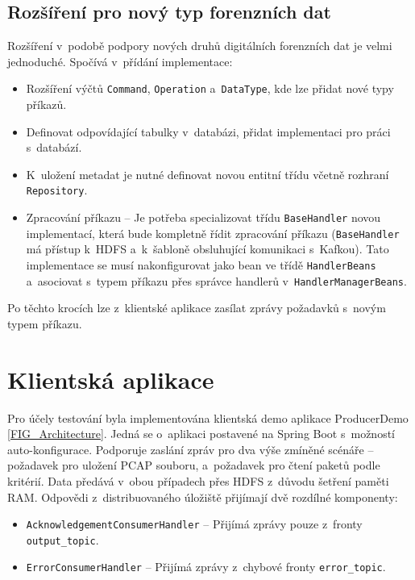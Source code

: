 \subsection{Rozšíření pro nový typ forenzních dat}
Rozšíření v~podobě podpory nových druhů digitálních forenzních dat je velmi jednoduché. Spočívá v~přídání implementace:

\begin{itemize}
    \item Rozšíření výčtů \texttt{Command}, \texttt{Operation} a~\texttt{DataType}, kde lze přidat nové typy příkazů.
    
    \item Definovat odpovídající tabulky v~databázi, přidat implementaci pro práci s~databází.
    
    \item K~uložení metadat je nutné definovat novou entitní třídu včetně rozhraní \texttt{Repository}.
    
    \item Zpracování příkazu -- Je potřeba specializovat třídu \texttt{BaseHandler} novou implementací, která bude kompletně řídit zpracování příkazu (\texttt{BaseHandler} má přístup k~HDFS a~k~šabloně obsluhující komunikaci s~Kafkou). Tato implementace se musí nakonfigurovat jako bean ve třídě \texttt{HandlerBeans} a~asociovat s~typem příkazu přes správce handlerů v~\texttt{HandlerManagerBeans}.
\end{itemize}

\noindent Po těchto krocích lze z~klientské aplikace zasílat zprávy požadavků s~novým typem příkazu.

\section{Klientská aplikace}
Pro účely testování byla implementována klientská demo aplikace ProducerDemo \ref{FIG_Architecture}. Jedná se o~aplikaci postavené na Spring Boot s~možností auto-konfigurace. Podporuje zaslání zpráv pro dva výše zmíněné scénáře -- požadavek pro uložení PCAP souboru, a~požadavek pro čtení paketů podle kritérií. Data předává v~obou případech přes HDFS z~důvodu šetření paměti RAM. Odpovědi z~distribuovaného úložiště přijímají dvě rozdílné komponenty:

\begin{itemize}
    \item \texttt{AcknowledgementConsumerHandler} -- Přijímá zprávy pouze z~fronty \texttt{output\_topic}.
    
    \item \texttt{ErrorConsumerHandler} -- Přijímá zprávy z~chybové fronty \texttt{error\_topic}.
\end{itemize}


